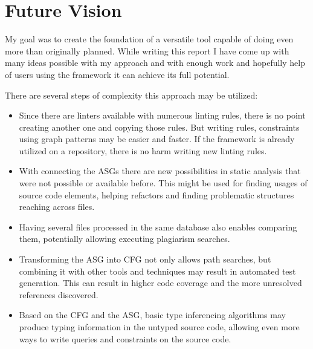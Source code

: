 \chapter{Future Vision}
\label{chap:future-vision}

My goal was to create the foundation of a versatile tool capable of doing even more than originally planned. While writing this report I have come up with many ideas possible with my approach and with enough work and hopefully help of users using the framework it can achieve its full potential.

There are several steps of complexity this approach may be utilized:

\begin{itemize}[topsep=0pt]
  \item Since there are linters available with numerous linting rules, there is no point creating another one and copying those rules. But writing rules, constraints using graph patterns may be easier and faster. If the framework is already utilized on a repository, there is no harm writing new linting rules.

  \item With connecting the ASGs there are new possibilities in static analysis that were not possible or available before. This might be used for finding usages of source code elements, helping refactors and finding problematic structures reaching across files.

  \item Having several files processed in the same database also enables comparing them, potentially allowing executing plagiarism searches.

  \item Transforming the ASG into CFG not only allows path searches, but combining it with other tools and techniques may result in automated test generation. This can result in higher code coverage and the more unresolved references discovered.

  \item Based on the CFG and the ASG, basic type inferencing algorithms may produce typing information in the untyped source code, allowing even more ways to write queries and constraints on the source code.
\end{itemize}
